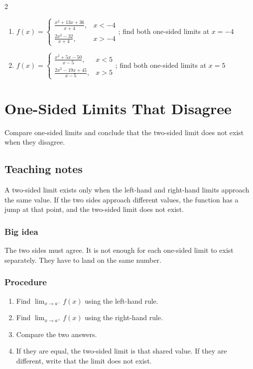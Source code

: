 \documentclass[11pt,oneside]{book}
\newenvironment{rulebox}[1]{\par\medskip\noindent{\color{navy}\bfseries #1}\par\noindent{\color{navy}\hrule}\smallskip}{\par\smallskip\noindent{\color{navy}\hrule}\par\medskip}
\begin{document}
\begin{multicols}{2}
\begin{enumerate}[leftmargin=*,label=\textbf{\arabic*.},itemsep=0.65\baselineskip]
\item $f(x)=\begin{cases} \frac{x^{2} + 13 x + 36}{x + 4}, & x<-4\\ \frac{2 x^{2} - 32}{x + 4}, & x>-4 \end{cases}$; find both one-sided limits at $x=-4$
\item $f(x)=\begin{cases} \frac{x^{2} + 5 x - 50}{x - 5}, & x<5\\ \frac{2 x^{2} - 19 x + 45}{x - 5}, & x>5 \end{cases}$; find both one-sided limits at $x=5$
\end{enumerate}
\end{multicols}

\chapter{One-Sided Limits That Disagree}
\begin{rulebox}{Learning target}
Compare one-sided limits and conclude that the two-sided limit does not exist when they disagree.
\end{rulebox}
\section*{Teaching notes}
A two-sided limit exists only when the left-hand and right-hand limits approach the same value. If the two sides approach different values, the function has a jump at that point, and the two-sided limit does not exist.

\subsection*{Big idea}
The two sides must agree. It is not enough for each one-sided limit to exist separately. They have to land on the same number.

\subsection*{Procedure}
\begin{enumerate}[leftmargin=*]
\item Find $\lim_{x\to a^-}f(x)$ using the left-hand rule.
\item Find $\lim_{x\to a^+}f(x)$ using the right-hand rule.
\item Compare the two answers.
\item If they are equal, the two-sided limit is that shared value. If they are different, write that the limit does not exist.
\end{enumerate}
\end{document}
